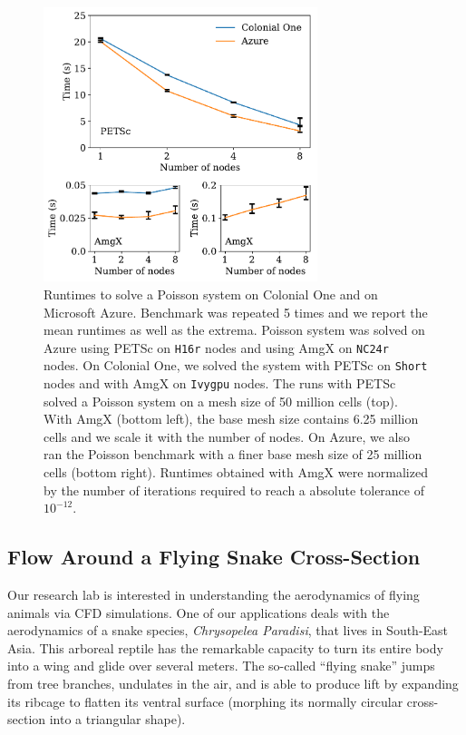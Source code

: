 \documentclass[10pt,journal,compsoc]{IEEEtran}
\begin{document}
\begin{figure}[!h]
    \centering
    \includegraphics[width=8cm]{figures/poisson_time_vs_nodes.pdf}
    \caption{Runtimes to solve a Poisson system on Colonial One and on Microsoft Azure. Benchmark was repeated 5 times and we report the mean runtimes as well as the extrema. Poisson system was solved on Azure using PETSc on \texttt{H16r} nodes and using AmgX on \texttt{NC24r} nodes. On Colonial One, we solved the system with PETSc on \texttt{Short} nodes and with AmgX on \texttt{Ivygpu} nodes. The runs with PETSc solved a Poisson system on a mesh size of 50 million cells (top). With AmgX (bottom left), the base mesh size contains 6.25 million cells and we scale it with the number of nodes. On Azure, we also ran the Poisson benchmark with a finer base mesh size of 25 million cells (bottom right). Runtimes obtained with AmgX were normalized by the number of iterations required to reach a absolute tolerance of $10^{-12}$.}
    \label{fig:poisson_benchmarks}
\end{figure}

\subsection{Flow Around a Flying Snake Cross-Section}\label{subsec:snake}

Our research lab is interested in understanding the aerodynamics of flying animals via CFD simulations.
One of our applications deals with the aerodynamics of a snake species, \textit{Chrysopelea Paradisi}, that lives in South-East Asia.
This arboreal reptile has the remarkable capacity to turn its entire body into a wing and glide over several meters\cite{socha_2011}.
The so-called ``flying snake'' jumps from tree branches, undulates in the air, and is able to produce lift by expanding its ribcage to flatten its ventral surface (morphing its normally circular cross-section into a triangular shape).
\end{document}
